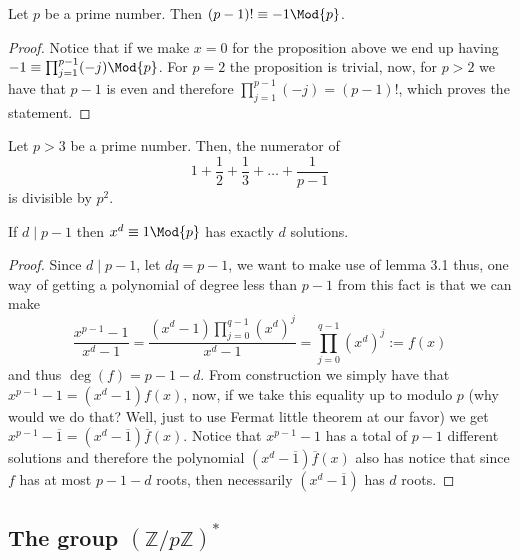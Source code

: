 \begin{corollary}
   Let \(p\) be a prime number. Then \((p-1)! \equiv -1 \Mod{p}\).
\end{corollary}

\begin{proof}
   Notice that if we make \(x = 0\) for the proposition above we end up having
   \(-1 \equiv \prod_{j=1}^{p-1}(-j) \Mod{p}\). For \(p = 2\) the proposition is
   trivial, now, for \(p > 2\) we have that \(p-1\) is even and therefore
   \(\prod_{j=1}^{p-1}(-j) = (p-1)!\), which proves the statement.
\end{proof}

\begin{proposition}
   Let \(p > 3\) be a prime number. Then, the numerator of  
   \[
      1 + \frac{1}{2} + \frac{1}{3} + \dots + \frac{1}{p-1}
   \] 
   is divisible by \(p^2\).
\end{proposition}


\begin{proposition}
   If \(d \mid p-1\) then \(x^d \equiv 1 \Mod{p}\) has exactly \(d\) solutions.
\end{proposition}

\begin{proof}
   Since \(d \mid p-1\), let \(dq = p-1\), we want to make use of lemma 3.1
   thus, one way of getting a polynomial of degree less than \(p-1\) from this
   fact is that we can make
   \[
      \frac{x^{p-1} - 1}{x^d - 1} = \frac{(x^d - 1) \prod_{j=0}^{q-1}
      (x^d)^j}{x^d - 1} = \prod_{j=0}^{q-1} (x^d)^{j} := f(x)
   \] 
   and thus \(\deg(f) = p-1-d\). From construction we simply have that \(x^{p-1}
   - 1 = (x^d - 1)f(x)\), now, if we take this equality up to modulo \(p\) (why
   would we do that? Well, just to use Fermat little theorem at our favor) we
   get \(x^{p-1} - \overline{1} = (x^d - \overline{1}) \overline{f}(x)\). Notice
   that \(x^{p-1} - 1\) has a total of \(p-1\) different solutions and therefore
   the polynomial \((x^d - \overline{1}) \overline{f}(x)\) also has notice that
   since \(f\) has at most \(p-1-d\) roots, then necessarily \((x^d -
   \overline{1})\) has \(d\) roots. 
\end{proof}

\subsection{The group \texorpdfstring{\((\mathbb{Z}/p\mathbb{Z})^\ast\)}{(Z/pZ)*}}

